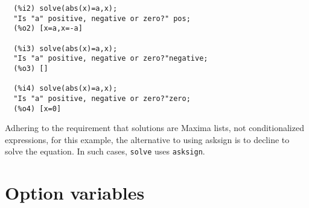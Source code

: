 \documentclass[]{scrartcl}
\begin{document}
\begin{verbatim}
  (%i2)	solve(abs(x)=a,x);
  "Is "a" positive, negative or zero?" pos;
  (%o2)	[x=a,x=-a]

  (%i3)	solve(abs(x)=a,x);
  "Is "a" positive, negative or zero?"negative;
  (%o3)	[]

  (%i4)	solve(abs(x)=a,x);
  "Is "a" positive, negative or zero?"zero;
  (%o4)	[x=0]
\end{verbatim}
Adhering to the requirement that solutions are Maxima lists, not conditionalized expressions,
for this example, the alternative to using asksign is to decline to solve the equation. In
such cases, \texttt{solve} uses \texttt{asksign}.

\section{Option variables}
\end{document}
